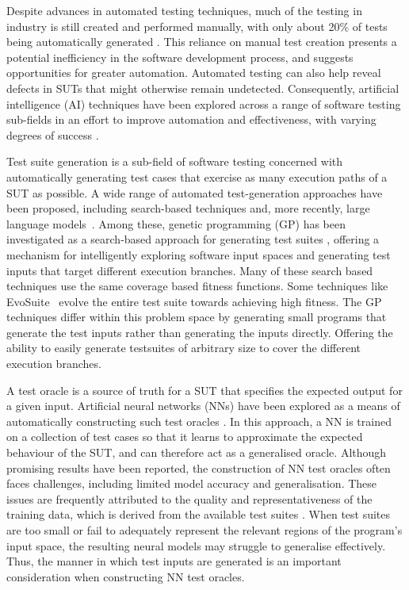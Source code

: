 \documentclass[runningheads]{llncs}
\begin{document}
Despite advances in automated testing techniques, much of the testing in industry is still created and performed manually, with only about 20\% of tests being automatically generated \cite{backstrom2022industrial}. This reliance on manual test creation presents a potential inefficiency in the software development process, and suggests opportunities for greater automation. Automated testing can also help reveal defects in SUTs that might otherwise remain undetected. Consequently, artificial intelligence (AI) techniques have been explored across a range of software testing sub-fields in an effort to improve automation and effectiveness, with varying degrees of success \cite{garousi2016systematic, fernandes2021agents, boukhlif2024natural}.

Test suite generation is a sub-field of software testing concerned with automatically generating test cases that exercise as many execution paths of a SUT as possible. A wide range of automated test-generation approaches have been proposed, including search-based techniques and, more recently, large language models~\cite{khari2020empirical,tang2024chatgpt}. Among these, genetic programming (GP) has been investigated as a search-based approach for generating test suites \cite{goschen2022genetic}, offering a mechanism for intelligently exploring software input spaces and generating test inputs that target different execution branches. Many of these search based techniques use the same coverage based fitness functions. Some techniques like EvoSuite~\cite{fraser2011evosuite} evolve the entire test suite towards achieving high fitness. The GP techniques differ within this problem space by generating small programs that generate the test inputs rather than generating the inputs directly. Offering the ability to easily generate testsuites of arbitrary size to cover the different execution branches.

A test oracle is a source of truth for a SUT that specifies the expected output for a given input. Artificial neural networks (NNs) have been explored as a means of automatically constructing such test oracles \cite{ye2006automated}. In this approach, a NN is trained on a collection of test cases so that it learns to approximate the expected behaviour of the SUT, and can therefore act as a generalised oracle. Although promising results have been reported, the construction of NN test oracles often faces challenges, including limited model accuracy and generalisation. These issues are frequently attributed to the quality and representativeness of the training data, which is derived from the available test suites \cite{hossain2023neural}. When test suites are too small or fail to adequately represent the relevant regions of the program's input space, the resulting neural models may struggle to generalise effectively. Thus, the manner in which test inputs are generated is an important consideration when constructing NN test oracles.
\end{document}
